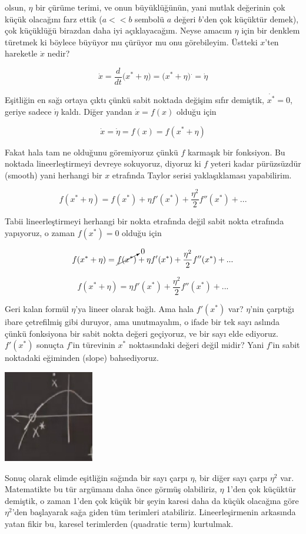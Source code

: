 \documentclass[12pt,fleqn]{article}\usepackage{../../common}
\begin{document}
olsun, $\eta$ bir çürüme terimi, ve onun büyüklüğünün, yani mutlak değerinin
çok küçük olacağını farz ettik ($a<<b$ sembolü $a$ değeri $b$'den çok küçüktür
demek), çok küçüklüğü birazdan daha iyi açıklayacağım. Neyse amacım $\eta$ için
bir denklem türetmek ki böylece büyüyor mu çürüyor mu onu görebileyim. Üstteki
$x$'ten hareketle $\dot{x}$ nedir?

$$ 
\dot{x} = \frac{d}{dt}( x^* + \eta \big) =
\big( x^* + \eta \big)^{\textbf{.}} = \dot{\eta} 
$$

Eşitliğin en sağı ortaya çıktı çünkü sabit noktada değişim sıfır demiştik,
$\dot{x^*} = 0$, geriye sadece $\dot{\eta}$ kaldı. Diğer yandan $\dot{x}=f(x)$
olduğu için

$$ 
\dot{x} = \dot{\eta} = f(x) = f(x^* + \eta) 
$$

Fakat hala tam ne olduğunu göremiyoruz çünkü $f$ karmaşık bir fonksiyon. Bu
noktada lineerleştirmeyi devreye sokuyoruz, diyoruz ki $f$ yeteri kadar
pürüzsüzdür (smooth) yani herhangi bir $x$ etrafında Taylor serisi
yaklaşıklaması yapabilirim. 

$$ 
f(x^* + \eta) = f(x^*) + \eta f'(x^*) + \frac{\eta^2}{2}f''(x^*) + ...
$$

Tabii lineerleştirmeyi herhangi bir nokta etrafında değil sabit nokta etrafında
yapıyoruz, o zaman $f(x^*)=0$ olduğu için

$$ 
f(x^* + \eta) = \cancelto{0}{f(x^*)} + \eta f'(x^*) +
\frac{\eta^2}{2}f''(x^*) + ...
$$

$$ f(x^* + \eta) =  \eta f'(x^*) + \frac{\eta^2}{2}f''(x^*) + ...$$

Geri kalan formül $\eta$'ya lineer olarak bağlı. Ama hala $f'(x^*)$ var?
$\eta$'nin çarptığı ibare çetrefilmiş gibi duruyor, ama unutmayalım, o ifade bir
tek sayı aslında çünkü fonksiyona bir sabit nokta değeri geçiyoruz, ve bir sayı
elde ediyoruz. $f'(x^*)$ sonuçta $f$'in türevinin $x^*$ noktasındaki değeri
değil midir? Yani $f$'in sabit noktadaki eğiminden (slope) bahsediyoruz.

\includegraphics[height=4cm]{02_02.png}

Sonuç olarak elimde eşitliğin sağında bir sayı çarpı $\eta$, bir diğer sayı
çarpı $\eta^2$ var. Matematikte bu tür argümanı daha önce görmüş olabiliriz,
$\eta$ 1'den çok küçüktür demiştik, o zaman 1'den çok küçük bir şeyin karesi
daha da küçük olacağına göre $\eta^2$'den başlayarak sağa giden tüm terimleri
atabiliriz. Lineerleşirmenin arkasında yatan fikir bu, karesel terimlerden
(quadratic term) kurtulmak.
\end{document}
